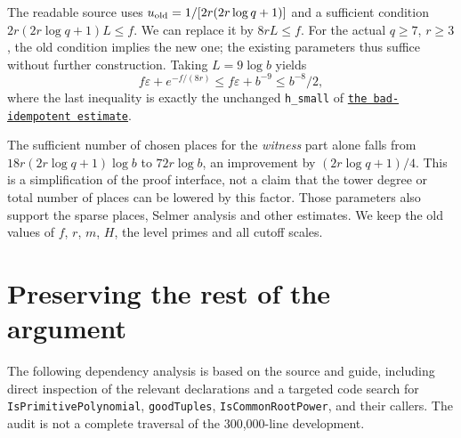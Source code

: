 \documentclass[11pt]{article}
\theoremstyle{definition}\newtheorem{definition}[theorem]{Definition}
\newcommand{\src}[2]{\href{https://github.com/VladimirReshetnikov/ProveIt/blob/ee10f937fedac0955d28b7b860f4c44fab508204/Analysis/GeneralizedRiemannHypothesis/Lean/grh/src/#1}{\texttt{#2}}}
\begin{document}
The readable source uses $u_{\rm old}=1/[2r(2r\log q+1)]$ and a sufficient condition $2r(2r\log q+1)L\le f$. We can replace it by $8rL\le f$. For the actual $q\ge7$, $r\ge3$, the old condition implies the new one; the existing parameters thus suffice without further construction. Taking $L=9\log b$ yields
\[
      f\varepsilon+e^{-f/(8r)}\le f\varepsilon+b^{-9}\le b^{-8}/2,
\]
where the last inequality is exactly the unchanged \texttt{h\_small} of \src{New/Spanning/SecondMoment/SpanningTheorem.lean\#L221}{the bad-idempotent estimate}.

The sufficient number of chosen places for the \emph{witness} part alone falls from $18r(2r\log q+1)\log b$ to $72r\log b$, an improvement by $(2r\log q+1)/4$. This is a simplification of the proof interface, not a claim that the tower degree or total number of places can be lowered by this factor. Those parameters also support the sparse places, Selmer analysis and other estimates. We keep the old values of $f$, $r$, $m$, $H$, the level primes and all cutoff scales.

\section{Preserving the rest of the argument}\label{sec:integrate}
The following dependency analysis is based on the source and guide, including direct inspection of the relevant declarations and a targeted code search for \texttt{IsPrimitivePolynomial}, \texttt{goodTuples}, \texttt{IsCommonRootPower}, and their callers. The audit is not a complete traversal of the 300,000-line development.
\end{document}
